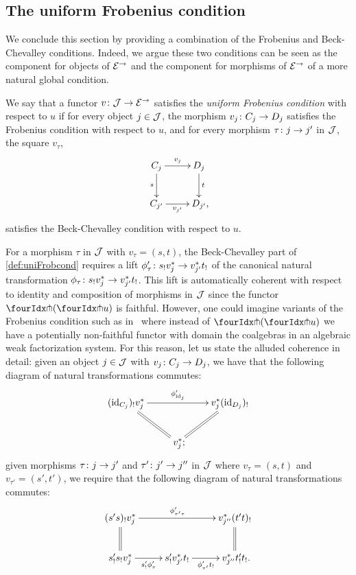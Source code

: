 \documentclass[reqno,10pt,a4paper,oneside,draft]{amsart}
\begin{document}
\subsection*{The uniform Frobenius condition}

We conclude this section by providing a combination of the Frobenius and Beck-Chevalley conditions.
Indeed, we argue these two conditions can be seen as the component for objects of $\catE^\to$ and the component for morphisms of $\catE^\to$ of a more natural global condition.

\begin{definition} \label{def:uniFrobcond}
We say that a functor $v \co \cal{J} \to \catE^\to$ satisfies the \emph{uniform Frobenius condition} with respect to $u$ if for every object $j \in \cal{J}$, the morphism $v_j \co C_j \to D_j$ satisfies the Frobenius condition with respect to $u$, and for every morphism $\tau \co j \to j'$ in $\cal{J}$, the square $v_\tau$,
\[
\xymatrix{
  C_j
  \ar[r]^{v_j}
  \ar[d]_{s}
&
  D_j
  \ar[d]^{t}
\\
  C_{j'}
  \ar[r]_-{v_{j'}}
&
  D_{j'}
\rlap{,}}
\]
satisfies the Beck-Chevalley condition with respect to $u$.
\end{definition}

\begin{remark} \label{bc-coherence}
For a morphism $\tau$ in $\cal{J}$ with $v_\tau = (s, t)$, the Beck-Chevalley part of \cref{def:uniFrobcond} requires a lift $\phi_\tau' \co s_! v_j^* \to v_{j'}^* t_!$ of the canonical natural transformation $\phi_\tau \co s_! v_j^* \to v_{j'}^* t_!$.
This lift is automatically coherent with respect to identity and composition of morphisms in $\cal{J}$ since the functor $\liftl{(\liftr{u})}$ is faithful.
However, one could imagine variants of the Frobenius condition such as in~\cite{garner:topological-simplicial} where instead of $\liftl{(\liftr{u})}$ we have a potentially non-faithful functor with domain the coalgebras in an algebraic weak factorization system.
For this reason, let us state the alluded coherence in detail: given an object $j \in \cal{J}$ with $v_j \co C_j \to D_j$, we have that the following diagram of natural transformations commutes:
\[
\xymatrix{
  (\id_{C_j})_! v_j^*
  \ar[rr]^{\phi'_{\id_j}}
  \ar@{=}[dr]
&&
  v_j^* (\id_{D_j})_!
  \ar@{=}[dl]
\\&
  v_j^*
\rlap{;}}
\]
given morphisms $\tau \co j \to j'$ and $\tau' \co j' \to j''$ in $\cal{J}$ where $v_\tau = (s, t)$ and $v_{\tau'} = (s', t')$, we require that the following diagram of natural transformations commutes:
\[
\xymatrix{
  (s' s)_! v_j^*
  \ar[rr]^{\phi'_{\tau' \tau}}
  \ar@{=}[d]
&&
  v_{j''}^* (t' t)_!
  \ar@{=}[d]
\\
  s'_! s_! v_j^*
  \ar[r]_{s'_! \phi'_\tau}
&
  s'_! v_{j'}^* t_!
  \ar[r]_{\phi'_{\tau'} t_!}
&
  v_{j''}^* t'_! t_!  
\rlap{.}}
\]
\end{remark}
\end{document}
